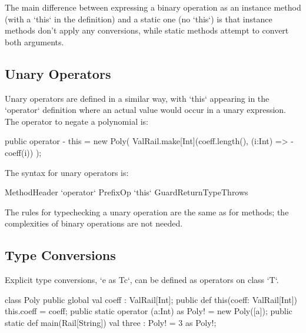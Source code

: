 The main difference between expressing a binary operation as an instance
method (with a \xcd`this` in the definition) and a static one (no \xcd`this`)
is that instance methods don't apply any conversions, while static methods
attempt to convert both arguments. 


\subsection{Unary Operators}

Unary operators are defined in a similar way, with \xcd`this` appearing in the
\xcd`operator` definition where an actual value would occur in a unary
expression.  The operator to negate a polynomial is: 

\begin{xten}
  public operator - this = new Poly(
    ValRail.make[Int](coeff.length(), (i:Int) => -coeff(i))
    );
\end{xten}

The syntax for unary operators is:

\begin{grammar}
MethodHeader \:
  \xcd`operator` PrefixOp \xcd`this`    Guard\opt ReturnType\opt  Throws\opt 
\end{grammar}

The rules for typechecking a unary operation are the same as for methods; the
complexities of binary operations are not needed.



\subsection{Type Conversions}

Explicit type conversions, \xcd`e as T{c}`, can be defined as operators on
class \xcd`T`.

\begin{xten}
class Poly {
  public global val coeff : ValRail[Int];
  public def this(coeff: ValRail[Int]) { this.coeff = coeff;}
  public static operator (a:Int) as Poly! = new Poly([a]);
  public static def main(Rail[String]) {
     val three : Poly! = 3 as Poly!;
  }
}
\end{xten}
%



